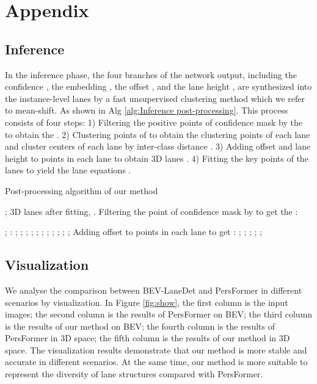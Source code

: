 \documentclass[10pt,twocolumn,letterpaper]{article}
\begin{document}
{
	\small
	
	
}
\clearpage
\appendix
\section{Appendix}

\subsection{Inference}
In the inference phase, the four branches of the network output, including the confidence , the embedding , the offset , and the lane height , are synthesized into the instance-level lanes by a fast unsupervised clustering method which we refer to mean-shift. As shown in Alg \ref{alg:Inference post-processing}. This process consists of four steps: 1) Filtering the positive points of confidence mask  by the  to obtain the . 2) Clustering points of  to obtain the clustering points of each lane   and cluster centers of each lane  by inter-class distance . 3) Adding offset  and lane height   to points in each lane to obtain 3D lanes . 4) Fitting the key points of the lanes  to yield the lane equations .


\renewcommand{\algorithmicrequire}{\textbf{Input:}}
\renewcommand{\algorithmicensure}{\textbf{Output:}}
\begin{algorithm}\footnotesize
\caption{Post-processing algorithm of our method}
\label{alg:Inference post-processing}
\begin{algorithmic}[1]\REQUIRE ;
\ENSURE 3D lanes after fitting, .
\STATE Filtering the point of confidence mask by  to get the :

\FOR{; ; }
\FOR{; ; }
\IF{}
\STATE ;
\ENDIF
\ENDFOR
\ENDFOR
{}:
\FOR{; ; }
\STATE ;
\STATE ;
\STATE ;
\FOR{; ; }
\STATE ;
\STATE ;
\IF{}
\STATE ;
\STATE ;
\ENDIF
\ENDFOR
\IF{}
\STATE ;
\STATE ;
\STATE ;
\ELSE 
\STATE ;
\STATE 
\ENDIF
\ENDFOR
\STATE Adding offset to points in each lane to get :
\FOR{; ; }
\STATE ;
\STATE ;
\STATE ;
\STATE ;
\ENDFOR
\STATE ;

\end{algorithmic}
\end{algorithm} 
\subsection{Visualization}
We analyse the comparison between BEV-LaneDet and PersFormer\cite{chen2022persformer} in different scenarios by visualization. In Figure \ref{fig:show}, the first column is the input images; the second column is the results of PersFormer on BEV; the third column is the results of our method on BEV; the fourth column is the results of PersFormer in 3D space; the fifth column is the results of our method in 3D space. The visualization results demonstrate that our method is more stable and accurate in different scenarios. At the same time, our method is more suitable to represent the diversity of lane structures compared with PersFormer.
\end{document}
